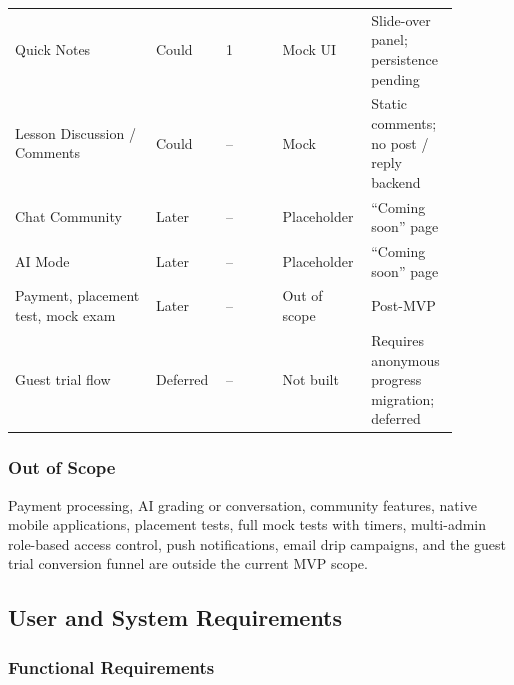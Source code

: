 \begin{longtable}{p{0.30\linewidth} p{0.14\linewidth} p{0.12\linewidth} p{0.14\linewidth} p{0.18\linewidth}}
Quick Notes & Could & 1 & Mock UI & Slide-over panel; persistence pending \\
Lesson Discussion / Comments & Could & -- & Mock & Static comments; no post / reply backend \\
Chat Community & Later & -- & Placeholder & ``Coming soon'' page \\
AI Mode & Later & -- & Placeholder & ``Coming soon'' page \\
Payment, placement test, mock exam & Later & -- & Out of scope & Post-MVP \\
Guest trial flow & Deferred & -- & Not built & Requires anonymous progress migration; deferred \\
\bottomrule
\end{longtable}

\subsubsection{Out of Scope}

Payment processing, AI grading or conversation, community features, native mobile applications, placement tests, full mock tests with timers, multi-admin role-based access control, push notifications, email drip campaigns, and the guest trial conversion funnel are outside the current MVP scope.

\subsection{User and System Requirements}

\subsubsection{Functional Requirements}

